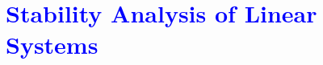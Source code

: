 \documentclass[../notes-main.tex]{subfiles}
\begin{document}
\chapter{\textcolor{blue}{Stability Analysis of Linear Systems}}
\end{document}
